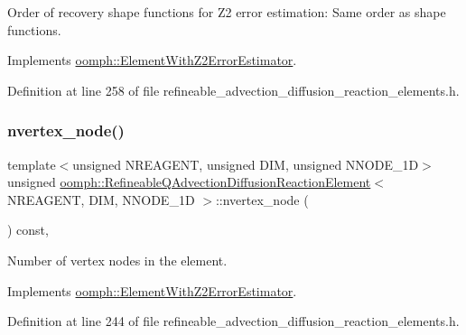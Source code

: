 Order of recovery shape functions for Z2 error estimation\+: Same order as shape functions. 



Implements \hyperlink{classoomph_1_1ElementWithZ2ErrorEstimator_af39480835bd3e0f6b2f4f7a9a4044798}{oomph\+::\+Element\+With\+Z2\+Error\+Estimator}.



Definition at line 258 of file refineable\+\_\+advection\+\_\+diffusion\+\_\+reaction\+\_\+elements.\+h.

\mbox{\label{classoomph_1_1RefineableQAdvectionDiffusionReactionElement_a3acfe299d116cbac0fcb40ac619687da}} 
\subsubsection{\texorpdfstring{nvertex\+\_\+node()}{nvertex\_node()}}
{\footnotesize\ttfamily template$<$unsigned N\+R\+E\+A\+G\+E\+NT, unsigned D\+IM, unsigned N\+N\+O\+D\+E\+\_\+1D$>$ \\
unsigned \hyperlink{classoomph_1_1RefineableQAdvectionDiffusionReactionElement}{oomph\+::\+Refineable\+Q\+Advection\+Diffusion\+Reaction\+Element}$<$ N\+R\+E\+A\+G\+E\+NT, D\+IM, N\+N\+O\+D\+E\+\_\+1D $>$\+::nvertex\+\_\+node (\begin{DoxyParamCaption}{ }\end{DoxyParamCaption}) const\hspace{0.3cm}{\ttfamily [inline]}, {\ttfamily [virtual]}}



Number of vertex nodes in the element. 



Implements \hyperlink{classoomph_1_1ElementWithZ2ErrorEstimator_a19495a0e77ef4ff35f15fdf7913b4077}{oomph\+::\+Element\+With\+Z2\+Error\+Estimator}.



Definition at line 244 of file refineable\+\_\+advection\+\_\+diffusion\+\_\+reaction\+\_\+elements.\+h.



